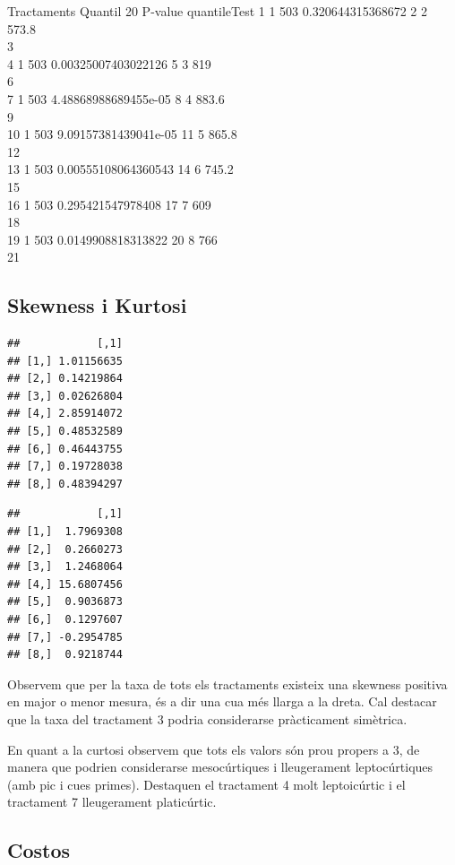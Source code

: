 \documentclass[
  11pt,
]{article}
\begin{document}
Tractaments Quantil 20 P-value quantileTest 1 1 503 0.320644315368672 2
2 573.8\\
3\\
4 1 503 0.00325007403022126 5 3 819\\
6\\
7 1 503 4.48868988689455e-05 8 4 883.6\\
9\\
10 1 503 9.09157381439041e-05 11 5 865.8\\
12\\
13 1 503 0.00555108064360543 14 6 745.2\\
15\\
16 1 503 0.295421547978408 17 7 609\\
18\\
19 1 503 0.0149908818313822 20 8 766\\
21

\hypertarget{skewness-i-kurtosi}{%
\subsection{Skewness i Kurtosi}\label{skewness-i-kurtosi}}

\begin{verbatim}
##            [,1]
## [1,] 1.01156635
## [2,] 0.14219864
## [3,] 0.02626804
## [4,] 2.85914072
## [5,] 0.48532589
## [6,] 0.46443755
## [7,] 0.19728038
## [8,] 0.48394297
\end{verbatim}

\begin{verbatim}
##            [,1]
## [1,]  1.7969308
## [2,]  0.2660273
## [3,]  1.2468064
## [4,] 15.6807456
## [5,]  0.9036873
## [6,]  0.1297607
## [7,] -0.2954785
## [8,]  0.9218744
\end{verbatim}

Observem que per la taxa de tots els tractaments existeix una skewness
positiva en major o menor mesura, és a dir una cua més llarga a la
dreta. Cal destacar que la taxa del tractament 3 podria considerarse
pràcticament simètrica.

En quant a la curtosi observem que tots els valors són prou propers a 3,
de manera que podrien considerarse mesocúrtiques i lleugerament
leptocúrtiques (amb pic i cues primes). Destaquen el tractament 4 molt
leptoicúrtic i el tractament 7 lleugerament platicúrtic.

\hypertarget{costos}{%
\subsection{Costos}\label{costos}}
\end{document}
